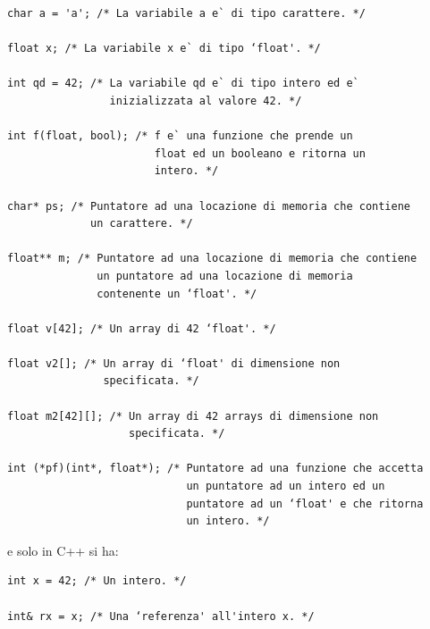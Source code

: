 \documentclass[a4paper,12pt, oneside]{book}
\begin{document}
	\begin{verbatim}
char a = 'a'; /* La variabile a e` di tipo carattere. */

float x; /* La variabile x e` di tipo ‘float'. */

int qd = 42; /* La variabile qd e` di tipo intero ed e`
                inizializzata al valore 42. */

int f(float, bool); /* f e` una funzione che prende un
                       float ed un booleano e ritorna un
                       intero. */
                       
char* ps; /* Puntatore ad una locazione di memoria che contiene
             un carattere. */

float** m; /* Puntatore ad una locazione di memoria che contiene
              un puntatore ad una locazione di memoria
              contenente un ‘float'. */

float v[42]; /* Un array di 42 ‘float'. */

float v2[]; /* Un array di ‘float' di dimensione non
               specificata. */
               
float m2[42][]; /* Un array di 42 arrays di dimensione non
                   specificata. */

int (*pf)(int*, float*); /* Puntatore ad una funzione che accetta
                            un puntatore ad un intero ed un
                            puntatore ad un ‘float' e che ritorna
                            un intero. */
\end{verbatim}
	e solo in C++ si ha:
	\begin{verbatim}
int x = 42; /* Un intero. */

int& rx = x; /* Una ‘referenza' all'intero x. */
\end{verbatim}
\end{document}
